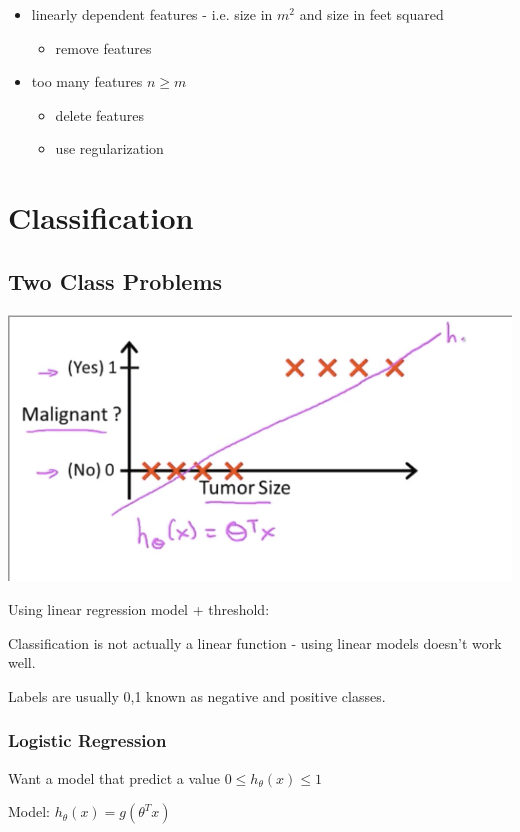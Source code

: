 \begin{itemize}
\item linearly dependent features - i.e. size in $m^2$ and size in feet squared
\begin{itemize}
\item remove features
\end{itemize}
\item too many features $n\ge m$ 
\begin{itemize}
  \item delete features 
  \item use regularization
\end{itemize}
\end{itemize}

\section{Classification}

\subsection{Two Class Problems}
\includegraphics[width=0.9\columnwidth]{ml_figures/log_threshold.png}

Using linear regression model + threshold:

Classification is not actually a linear function - using linear models doesn't work well.

Labels are usually {0,1} known as negative and positive classes.

\subsubsection{Logistic Regression}

Want a model that predict a value $0\le h_\theta(x)\le 1$

Model: $h_\theta(x)=g(\theta^T x)$ 

